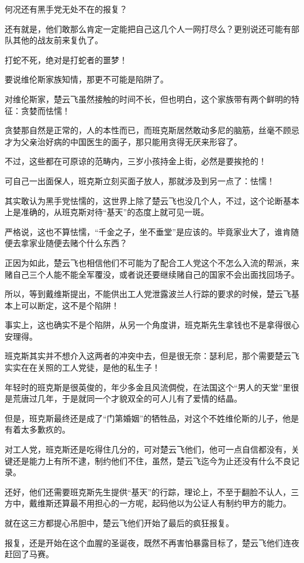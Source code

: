 何况还有黑手党无处不在的报复？

还有就是，他们敢那么肯定一定能把自己这几个人一网打尽么？更别说还可能有部队其他的战友前来复仇了。

打蛇不死，绝对是打蛇者的噩梦！

要说维伦斯家族知情，那更不可能是陷阱了。

对维伦斯家，楚云飞虽然接触的时间不长，但也明白，这个家族带有两个鲜明的特征：贪婪而怯懦！

贪婪那自然是正常的，人的本性而已，而班克斯居然敢动多尼的脑筋，丝毫不顾忌才为父亲治好病的中国医生的面子，那只能用贪得无厌来形容了。

不过，这些都在可原谅的范畴内，三岁小孩持金上街，必然是要挨抢的！

可自己一出面保人，班克斯立刻买面子放人，那就涉及到另一点了：怯懦！

其实敢认为黑手党怯懦的，这世界上除了楚云飞也没几个人，不过，这个论断基本上是准确的，从班克斯对待“基天”的态度上就可见一斑。

严格说，这也不算怯懦，“千金之子，坐不垂堂”是应该的。毕竟家业大了，谁肯随便去拿家业随便去赌个什么东西？

正因为如此，楚云飞也相信他们不可能为了配合工人党这个不怎么入流的帮派，来赌自己三个人能不能全军覆没，或者说还要继续赌自己的国家不会出面找回场子。

所以，等到戴维斯提出，不能供出工人党泄露波兰人行踪的要求的时候，楚云飞基本上可以断定，这不是个陷阱！

事实上，这也确实不是个陷阱，从另一个角度讲，班克斯先生拿钱也不是拿得很心安理得。

班克斯其实并不想介入这两者的冲突中去，但是很无奈：瑟利尼，那个需要楚云飞实实在在关照的工人党徒，是他的私生子！

年轻时的班克斯是很英俊的，年少多金且风流倜傥，在法国这个“男人的天堂”里很是荒唐过几年，于是就同一个才貌双全的可人儿有了爱情的结晶。

但是，班克斯最终还是成了“门第婚姻”的牺牲品，对这个不姓维伦斯的儿子，他是有着太多歉疚的。

对工人党，班克斯还是吃得住几分的，可对楚云飞他们，他可一点自信都没有，关键还是能力上有所不逮，制约他们不住，虽然，楚云飞迄今为止还没有什么不良记录。

还好，他们还需要班克斯先生提供“基天”的行踪，理论上，不至于翻脸不认人，三方中，戴维斯还算最不用担心的一方呢，起码他以为公证人有制约甲方的能力。

就在这三方都提心吊胆中，楚云飞他们开始了最后的疯狂报复。

报复，还是开始在这个血腥的圣诞夜，既然不再害怕暴露目标了，楚云飞他们连夜赶回了马赛。

